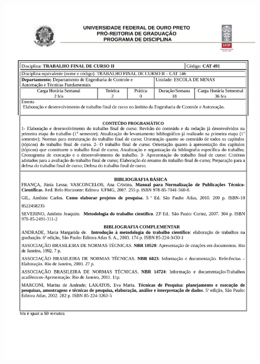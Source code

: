\begin{figure}[p]
	\centering 
	\includegraphics[scale=0.7]{capitulos/anexo1-programas-disciplina/p101.pdf}
\end{figure}

